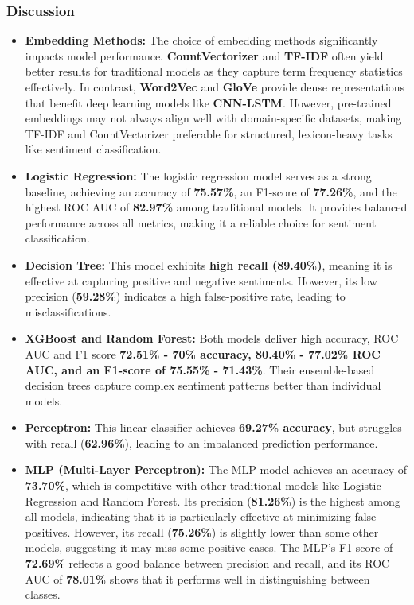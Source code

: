 \subsubsection{Discussion}

\begin{itemize}
    \item \textbf{Embedding Methods:} The choice of embedding methods significantly impacts model performance. 
    \textbf{CountVectorizer} and \textbf{TF-IDF} often yield better results for traditional models as they capture term frequency statistics effectively. 
    In contrast, \textbf{Word2Vec} and \textbf{GloVe} provide dense representations that benefit deep learning models like \textbf{CNN-LSTM}. 
    However, pre-trained embeddings may not always align well with domain-specific datasets, making TF-IDF and CountVectorizer preferable for structured, lexicon-heavy tasks like sentiment classification.

    \item \textbf{Logistic Regression:} The logistic regression model serves as a strong baseline, achieving an accuracy of \textbf{75.57\%}, an F1-score of \textbf{77.26\%}, and the highest ROC AUC of \textbf{82.97\%} among traditional models. It provides balanced performance across all metrics, making it a reliable choice for sentiment classification.

    \item \textbf{Decision Tree:} This model exhibits \textbf{high recall (89.40\%)}, meaning it is effective at capturing positive and negative sentiments. However, its low precision (\textbf{59.28\%}) indicates a high false-positive rate, leading to misclassifications.

    \item \textbf{XGBoost and Random Forest:} Both models deliver high accuracy, ROC AUC and F1 score \textbf{72.51\% - 70\% accuracy, 80.40\% - 77.02\% ROC AUC, and an F1-score of 75.55\% - 71.43\%}. Their ensemble-based decision trees capture complex sentiment patterns better than individual models.

    \item \textbf{Perceptron:} This linear classifier achieves \textbf{69.27\% accuracy}, but struggles with recall (\textbf{62.96\%}), leading to an imbalanced prediction performance.
    
    \item \textbf{MLP (Multi-Layer Perceptron):}  
    The MLP model achieves an accuracy of \textbf{73.70\%}, which is competitive with other traditional models like Logistic Regression and Random Forest. Its precision (\textbf{81.26\%}) is the highest among all models, indicating that it is particularly effective at minimizing false positives. However, its recall (\textbf{75.26\%}) is slightly lower than some other models, suggesting it may miss some positive cases. The MLP's F1-score of \textbf{72.69\%} reflects a good balance between precision and recall, and its ROC AUC of \textbf{78.01\%} shows that it performs well in distinguishing between classes.


\end{itemize}
